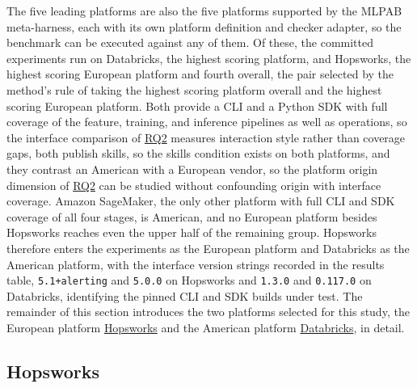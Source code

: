 \documentclass[
english,                 %
bibtex,                  %
]{kththesis}
\numberwithin{listing}{chapter}
\begin{document}
The five leading platforms are also the five platforms supported by the \gls{MLPAB} meta-harness, each with its own platform definition and checker adapter, so the benchmark can be executed against any of them. Of these, the committed experiments run on Databricks, the highest scoring platform, and Hopsworks, the highest scoring European platform and fourth overall, the pair selected by the method's rule of taking the highest scoring platform overall and the highest scoring European platform. Both provide a \gls{CLI} and a Python \gls{SDK} with full coverage of the feature, training, and inference pipelines as well as operations, so the interface comparison of \hyperref[rq2]{RQ2} measures interaction style rather than coverage gaps, both publish skills, so the skills condition exists on both platforms, and they contrast an American with a European vendor, so the platform origin dimension of \hyperref[rq2]{RQ2} can be studied without confounding origin with interface coverage. Amazon SageMaker, the only other platform with full \gls{CLI} and \gls{SDK} coverage of all four stages, is American, and no European platform besides Hopsworks reaches even the upper half of the remaining group. Hopsworks therefore enters the experiments as the European platform and Databricks as the American platform, with the interface version strings recorded in the results table, \texttt{5.1+alerting} and \texttt{5.0.0} on Hopsworks and \texttt{1.3.0} and \texttt{0.117.0} on Databricks, identifying the pinned \gls{CLI} and \gls{SDK} builds under test. The remainder of this section introduces the two platforms selected for this study, the European platform \hyperref[sec:results_hopsworks]{Hopsworks} and the American platform \hyperref[sec:results_databricks]{Databricks}, in detail.

\subsection{Hopsworks}
\label{sec:results_hopsworks}
\glsresetall
\end{document}
